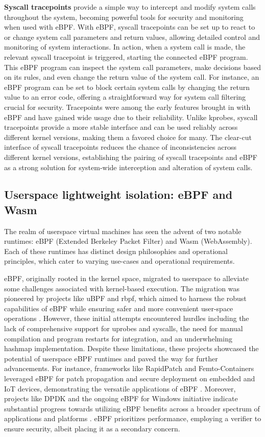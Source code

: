 \textbf{Syscall tracepoints} provide a simple way to intercept and modify system calls throughout the system, becoming powerful tools for security and monitoring when used with eBPF. With eBPF, syscall tracepoints can be set up to react to or change system call parameters and return values, allowing detailed control and monitoring of system interactions. In action, when a system call is made, the relevant syscall tracepoint is triggered, starting the connected eBPF program. This eBPF program can inspect the system call parameters, make decisions based on its rules, and even change the return value of the system call. For instance, an eBPF program can be set to block certain system calls by changing the return value to an error code, offering a straightforward way for system call filtering crucial for security. Tracepoints were among the early features brought in with eBPF and have gained wide usage due to their reliability. Unlike kprobes, syscall tracepoints provide a more stable interface and can be used reliably across different kernel versions, making them a favored choice for many. The clear-cut interface of syscall tracepoints reduces the chance of inconsistencies across different kernel versions, establishing the pairing of syscall tracepoints and eBPF as a strong solution for system-wide interception and alteration of system calls.

\subsection{Userspace lightweight isolation: eBPF and Wasm}

The realm of userspace virtual machines has seen the advent of two notable runtimes: eBPF (Extended Berkeley Packet Filter) and Wasm (WebAssembly). Each of these runtimes has distinct design philosophies and operational principles, which cater to varying use-cases and operational requirements.

eBPF, originally rooted in the kernel space, migrated to userspace to alleviate some challenges associated with kernel-based execution. The migration was pioneered by projects like uBPF and rbpf, which aimed to harness the robust capabilities of eBPF while ensuring safer and more convenient user-space operations \cite{ubpf, rbpf}. However, these initial attempts encountered hurdles including the lack of comprehensive support for uprobes and syscalls, the need for manual compilation and program restarts for integration, and an underwhelming hashmap implementation. Despite these limitations, these projects showcased the potential of userspace eBPF runtimes and paved the way for further advancements. For instance, frameworks like RapidPatch and Femto-Containers leveraged eBPF for patch propagation and secure deployment on embedded and IoT devices, demonstrating the versatile applications of eBPF \cite{rapidpatch, femto}. Moreover, projects like DPDK and the ongoing eBPF for Windows initiative indicate substantial progress towards utilizing eBPF benefits across a broader spectrum of applications and platforms \cite{dpdk-ebpf, windows-ebpf}. eBPF prioritizes performance, employing a verifier to ensure security, albeit placing it as a secondary concern.

